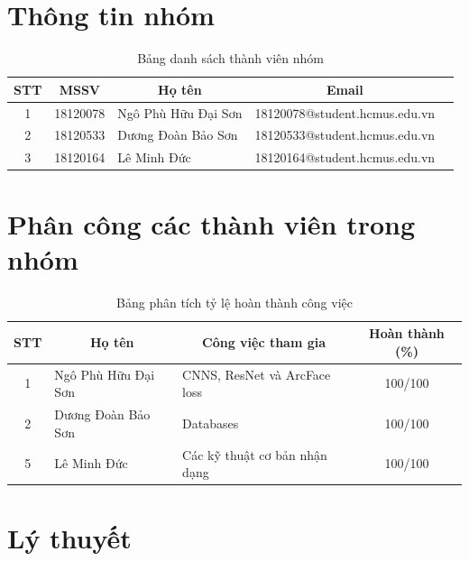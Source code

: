 \documentclass[a4paper, 12pt]{article}
\begin{document}
\section{Thông tin nhóm}
    \begin{table}[H]
        \centering
        \begin{tabular}{|c|c|l|c|c|}
        \hline
        STT & MSSV     & \multicolumn{1}{c|}{Họ tên} & Email\\ \hline
        1   & 18120078 & Ngô Phù Hữu Đại Sơn         & 18120078@student.hcmus.edu.vn\\ \hline
        2   & 18120533 & Dương Đoàn Bảo Sơn          & 18120533@student.hcmus.edu.vn\\ \hline
        3   & 18120164 & Lê Minh Đức                 & 18120164@student.hcmus.edu.vn\\ \hline
        \end{tabular}
        \caption{Bảng danh sách thành viên nhóm}
    \end{table}

\section{Phân công các thành viên trong nhóm}

    \begin{table}[H]
        \centering
        \begin{tabular}{|c|l|l|c|}
        \hline
        STT & \multicolumn{1}{c|}{Họ tên} & \multicolumn{1}{c|}{Công việc tham gia}  & Hoàn thành (\%) \\ \hline
        1   & Ngô Phù Hữu Đại Sơn         & CNNS, ResNet và ArcFace loss             & 100/100 \\ \hline
        2   & Dương Đoàn Bảo Sơn          & Databases                                & 100/100 \\ \hline
        5   & Lê Minh Đức                 & Các kỹ thuật cơ bản nhận dạng            & 100/100 \\ \hline
        \end{tabular}
        \caption{Bảng phân tích tỷ lệ hoàn thành công việc}
    \end{table}
\clearpage

\section{Lý thuyết}





\end{document}
